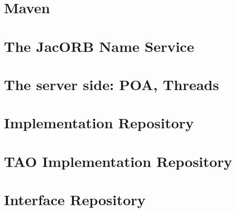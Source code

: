 \documentclass[12pt]{scrbook}
\begin{document}

\chapter{Maven}
\label{ch:mvn}




\chapter{The JacORB Name Service}
\label{ch:naming}




\chapter{The server side: POA, Threads}
\label{ch:POA}




\chapter{Implementation Repository}
\label{Ch_Imr}




\chapter{TAO Implementation Repository}
\label{ch:Tao_Imr}



\chapter{Interface Repository}
\label{ch:interface_repository}



\end{document}
